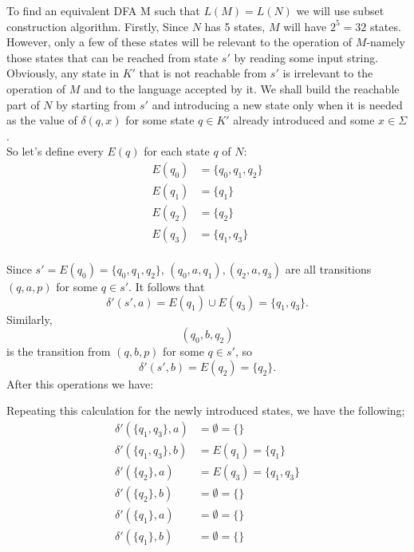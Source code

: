 \documentclass[12pt]{article}
\begin{document}
To find an equivalent DFA M such that $L(M) = L(N)$ we will use subset construction algorithm. Firstly, Since $N$ has 5 states, $M$ will have $2^{5}=32$ states. However, only a few of these states will be relevant to the operation of $M$-namely those states that can be reached from state $s'$ by reading some input string. Obviously, any state in $K'$ that is not reachable from $s'$ is irrelevant to the operation of $M$ and to the language accepted by it. We shall build the reachable part of $N$ by starting from $s'$ and introducing a new state only when it is needed as the value of $\delta(q,x)$ for some state $q\in K'$ already introduced and some $x \in \Sigma$.\\
So let's define every $E(q)$ for each state $q$ of $N$:
\begin{align*}
	E(q_0) &= \{q_0,q_1,q_2\} \\
	E(q_1) &= \{q_1\} \\
	E(q_2) &= \{q_2\} \\
	E(q_3) &= \{q_1,q_3\} \\
\end{align*}

Since $s' = E(q_0) = \{q_0,q_1,q_2\}$,
$(q_0,a,q_1), (q_2,a,q_3)$
are all transitions $(q,a,p)$ for some $q\in s'$. It follows that
$$\delta ' (s',a) = E(q_1)\cup E(q_3) = \{ q_1,q_3\}.$$
Similarly,
$$(q_0,b,q_2)$$
is the transition from $(q,b,p)$ for some $q\in s'$, so
$$\delta '(s',b) = E(q_2) = \{q_2\}.$$
After this operations we have:

\begin{center}
\end{center}

Repeating this calculation for the newly introduced states, we have the following;
\begin{align*}
\delta'(\{q_1,q_3\},a) &= \emptyset = \{\} \\
\delta'(\{q_1,q_3\},b) &= E(q_1) = \{ q_1\} \\
\delta'(\{q_2\},a) &= E(q_3) = \{ q_1,q_3\} \\
\delta'(\{q_2\},b) &= \emptyset = \{\} \\
\delta'(\{q_1\},a) &= \emptyset = \{\} \\
\delta'(\{q_1\},b) &= \emptyset = \{\} \\
\end{align*}
\end{document}
